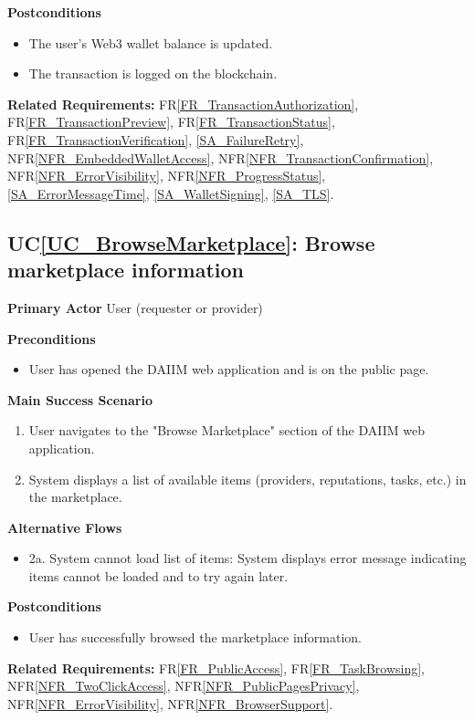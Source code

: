 \documentclass[12pt]{article}
\newcounter{ucnum} %
\newcommand{\ucref}[1]{UC\ref{#1}}
\newcommand{\rref}[1]{FR\ref{#1}}
\newcommand{\nfrref}[1]{NFR\ref{#1}}
\begin{document}
\textbf{Postconditions}
\begin{itemize}
\item The user's Web3 wallet balance is updated.
\item The transaction is logged on the blockchain.
\end{itemize}

\textbf{Related Requirements:} \rref{FR_TransactionAuthorization}, \rref{FR_TransactionPreview}, \rref{FR_TransactionStatus}, \rref{FR_TransactionVerification}, \ref{SA_FailureRetry}, \nfrref{NFR_EmbeddedWalletAccess}, \nfrref{NFR_TransactionConfirmation}, \nfrref{NFR_ErrorVisibility}, \nfrref{NFR_ProgressStatus}, \ref{SA_ErrorMessageTime}, \ref{SA_WalletSigning}, \ref{SA_TLS}.

 \label{UC_BrowseMarketplace}
\subsection{\ucref{UC_BrowseMarketplace}: Browse marketplace information}

\textbf{Primary Actor}
User (requester or provider)

\textbf{Preconditions}
\begin{itemize}
\item User has opened the DAIIM web application and is on the public page.
\end{itemize}

\textbf{Main Success Scenario}
\begin{enumerate}
\item User navigates to the "Browse Marketplace" section of the DAIIM web application.
\item System displays a list of available items (providers, reputations, tasks, etc.) in the marketplace.
\end{enumerate}

\textbf{Alternative Flows}
\begin{itemize}
\item 2a. System cannot load list of items: System displays error message indicating items cannot be loaded and to try again later.
\end{itemize}

\textbf{Postconditions}
\begin{itemize}
\item User has successfully browsed the marketplace information.
\end{itemize}

\textbf{Related Requirements:} \rref{FR_PublicAccess}, \rref{FR_TaskBrowsing}, \nfrref{NFR_TwoClickAccess}, \nfrref{NFR_PublicPagesPrivacy}, \nfrref{NFR_ErrorVisibility}, \nfrref{NFR_BrowserSupport}.
\end{document}
